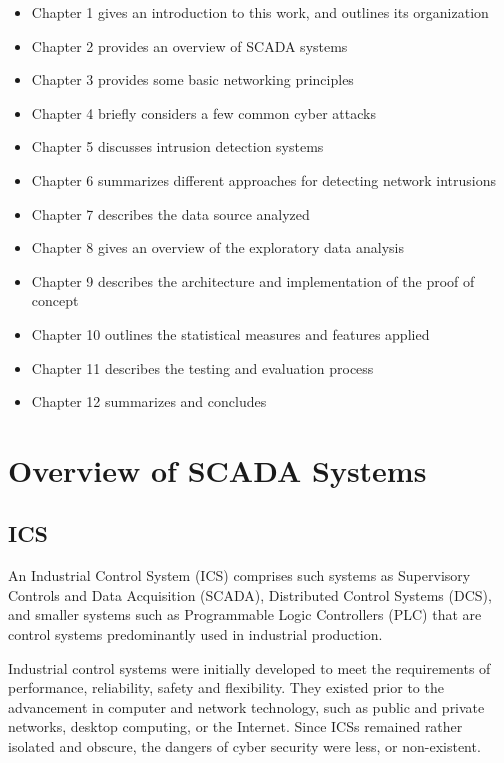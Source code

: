 \documentclass[11pt,]{article}
\begin{document}
\begin{itemize}
\itemsep1pt\parskip0pt
\item
  Chapter 1 gives an introduction to this work, and outlines its
  organization
\item
  Chapter 2 provides an overview of SCADA systems
\item
  Chapter 3 provides some basic networking principles
\item
  Chapter 4 briefly considers a few common cyber attacks
\item
  Chapter 5 discusses intrusion detection systems
\item
  Chapter 6 summarizes different approaches for detecting network
  intrusions
\item
  Chapter 7 describes the data source analyzed
\item
  Chapter 8 gives an overview of the exploratory data analysis
\item
  Chapter 9 describes the architecture and implementation of the proof
  of concept
\item
  Chapter 10 outlines the statistical measures and features applied
\item
  Chapter 11 describes the testing and evaluation process
\item
  Chapter 12 summarizes and concludes
\end{itemize}

\clearpage

\section{Overview of SCADA Systems}\label{overview-of-scada-systems}

\subsection{ICS}\label{ics}

An Industrial Control System (ICS) comprises such systems as Supervisory
Controls and Data Acquisition (SCADA), Distributed Control Systems
(DCS), and smaller systems such as Programmable Logic Controllers (PLC)
that are control systems predominantly used in industrial production.

Industrial control systems were initially developed to meet the
requirements of performance, reliability, safety and flexibility. They
existed prior to the advancement in computer and network technology,
such as public and private networks, desktop computing, or the Internet.
Since ICSs remained rather isolated and obscure, the dangers of cyber
security were less, or non-existent.
\end{document}
